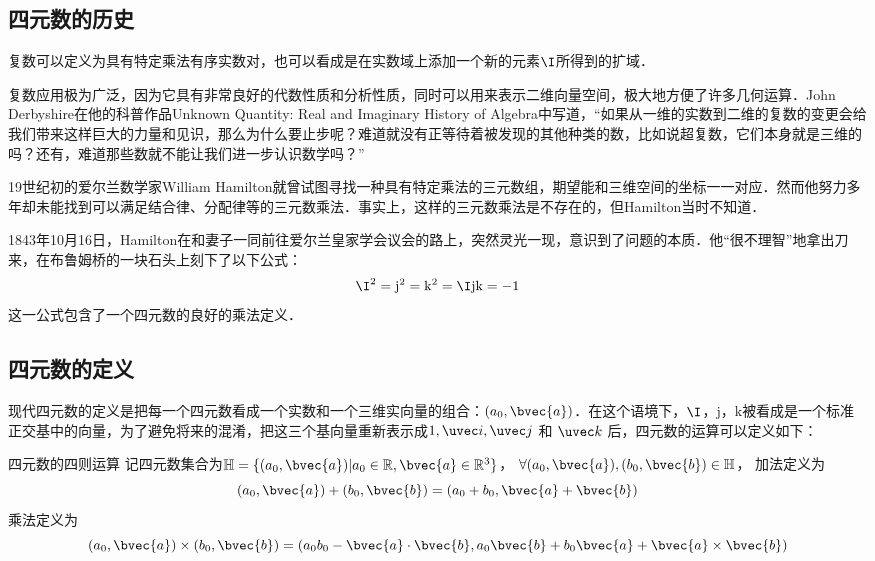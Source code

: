 
\subsection{四元数的历史}

复数可以定义为具有特定乘法有序实数对，也可以看成是在实数域上添加一个新的元素$  \I$所得到的扩域．

复数应用极为广泛，因为它具有非常良好的代数性质和分析性质，同时可以用来表示二维向量空间，极大地方便了许多几何运算．John Derbyshire在他的科普作品Unknown Quantity: Real and Imaginary History of Algebra中写道，“如果从一维的实数到二维的复数的变更会给我们带来这样巨大的力量和见识，那么为什么要止步呢？难道就没有正等待着被发现的其他种类的数，比如说超复数，它们本身就是三维的吗？还有，难道那些数就不能让我们进一步认识数学吗？”

19世纪初的爱尔兰数学家William Hamilton就曾试图寻找一种具有特定乘法的三元数组，期望能和三维空间的坐标一一对应．然而他努力多年却未能找到可以满足结合律、分配律等的三元数乘法．事实上，这样的三元数乘法是不存在的，但Hamilton当时不知道．

1843年10月16日，Hamilton在和妻子一同前往爱尔兰皇家学会议会的路上，突然灵光一现，意识到了问题的本质．他“很不理智”地拿出刀来，在布鲁姆桥的一块石头上刻下了以下公式：
\begin{equation}
\I^2=\mathrm{j}^2=\mathrm{k}^2=\I\mathrm{j}\mathrm{k}=-1
\end{equation}
这一公式包含了一个四元数的良好的乘法定义．

\subsection{四元数的定义}

现代四元数的定义是把每一个四元数看成一个实数和一个三维实向量的组合：$(a_0, \bvec{a})$．在这个语境下，$\I$，$\mathrm{j}$，$\mathrm{k}$被看成是一个标准正交基中的向量，为了避免将来的混淆，把这三个基向量重新表示成$1, \uvec i, \uvec j$ 和 $\uvec k$ 后，四元数的运算可以定义如下：

\begin{definition}{四元数的四则运算}
记四元数集合为$\mathbb{H}=\{(a_0, \bvec{a})|a_0\in\mathbb{R}, \bvec{a}\in\mathbb{R}^3\}$， $\forall(a_0, \bvec{a}), (b_0, \bvec{b})\in\mathbb{H}$， 加法定义为
\begin{equation}
(a_0, \bvec{a})+ (b_0, \bvec{b})=(a_0+b_0, \bvec{a}+\bvec{b})
\end{equation}
乘法定义为
\begin{equation}\label{Quat_eq1}
(a_0, \bvec{a})\times (b_0, \bvec{b})=(a_0b_0-\bvec{a}\cdot\bvec{b}, a_0\bvec{b}+b_0\bvec{a}+\bvec{a}\times\bvec{b})
\end{equation}
\end{definition}

